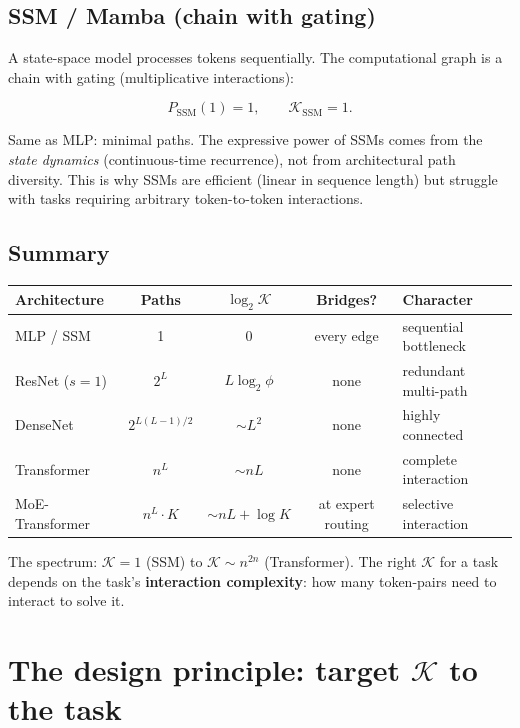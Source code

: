 \documentclass[11pt,a4paper]{article}
\newcommand{\K}{\mathcal{K}}
\begin{document}
\subsection{SSM / Mamba (chain with gating)}

A state-space model processes tokens sequentially.  The
computational graph is a chain with gating (multiplicative
interactions):

\begin{equation}
P_{\text{SSM}}(1) = 1, \qquad \K_{\text{SSM}} = 1.
\end{equation}

Same as MLP: minimal paths.  The expressive power of SSMs comes
from the \emph{state dynamics} (continuous-time recurrence), not
from architectural path diversity.  This is why SSMs are efficient
(linear in sequence length) but struggle with tasks requiring
arbitrary token-to-token interactions.

\subsection{Summary}

\begin{center}
\renewcommand{\arraystretch}{1.3}
\begin{tabular}{lcccl}
\toprule
\textbf{Architecture} & \textbf{Paths} & $\log_2 \K$ & \textbf{Bridges?} & \textbf{Character} \\
\midrule
MLP / SSM & 1 & 0 & every edge & sequential bottleneck \\
ResNet ($s{=}1$) & $2^L$ & $L \log_2 \phi$ & none & redundant multi-path \\
DenseNet & $2^{L(L-1)/2}$ & $\sim L^2$ & none & highly connected \\
Transformer & $n^L$ & $\sim nL$ & none & complete interaction \\
MoE-Transformer & $n^L \cdot K$ & $\sim nL + \log K$ & at expert routing & selective interaction \\
\bottomrule
\end{tabular}
\end{center}

The spectrum: $\K = 1$ (SSM) to $\K \sim n^{2n}$ (Transformer).
The right $\K$ for a task depends on the task's
\textbf{interaction complexity}: how many token-pairs need to
interact to solve it.


\section{The design principle: target $\K$ to the task}
\end{document}

